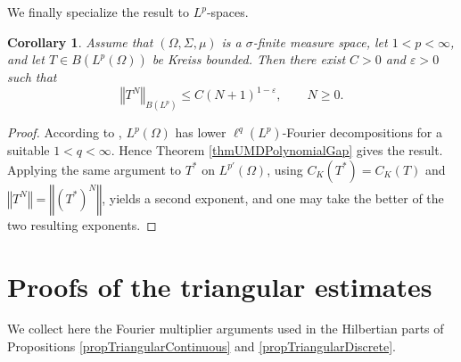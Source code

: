 \documentclass[12pt]{amsart}
\theoremstyle{plain}
\newtheorem{cor}[thm]{Corollary}
\theoremstyle{remark}
\theoremstyle{definition}
\newcommand{\norm}[1]{\left\Vert #1\right\Vert}
\begin{document}
	We finally specialize the result to $L^p$-spaces.
	
	\begin{cor}\label{corLpPolynomialGap}
		Assume that $(\Omega,\Sigma,\mu)$ is a $\sigma$-finite measure space, let
		$1<p<\infty$, and let $T\in B(L^p(\Omega))$ be Kreiss bounded. Then there
		exist $C>0$ and $\varepsilon>0$ such that
		\[
		\norm{T^N}_{B(L^p)}
		\le
		C(N+1)^{1-\varepsilon},
		\qquad N\ge0.
		\]
	\end{cor}
	
	\begin{proof}
		According to \cite[Example 2.12]{DengLoristVeraar}, $L^p(\Omega)$ has lower
		$\ell^q(L^p)$-Fourier decompositions for a suitable $1<q<\infty$. Hence
		Theorem \ref{thmUMDPolynomialGap} gives the result. Applying the same argument
		to $T^*$ on $L^{p'}(\Omega)$, using $C_K(T^*)=C_K(T)$ and
		$\norm{T^N}=\norm{(T^*)^N}$, yields a second exponent, and one may take the
		better of the two resulting exponents.
	\end{proof}
	
	
	\appendix
	\section{Proofs of the triangular estimates}\label{appTriangular}
	
	We collect here the Fourier multiplier arguments used in the Hilbertian parts of Propositions \ref{propTriangularContinuous} and \ref{propTriangularDiscrete}.
	
	
	
\end{document}
